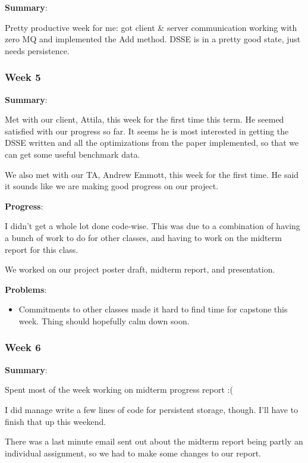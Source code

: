 \noindent \textbf{Summary}:

Pretty productive week for me: got client \& server communication working with zero MQ and implemented the Add method. DSSE is in a pretty good state, just needs persistence.

\subsubsection{Week 5}

\noindent \textbf{Summary}:

Met with our client, Attila, this week for the first time this term. He seemed satisfied with our progress so far. It seems he is most interested in getting the DSSE written and all the optimizations from the paper implemented, so that we can get some useful benchmark data. 

We also met with our TA, Andrew Emmott, this week for the first time.
He said it sounds like we are making good progress on our project.

\noindent \textbf{Progress}:

I didn't get a whole lot done code-wise. This was due to a combination of having a bunch of work to do for other classes, and having to work on the midterm report for this class.

We worked on our project poster draft, midterm report, and presentation.

\noindent \textbf{Problems}:

\begin{itemize}
\item Commitments to other classes made it hard to find time for capstone this week. Thing should hopefully calm down soon.
\end{itemize}


\subsubsection{Week 6}

\noindent \textbf{Summary}:

Spent most of the week working on midterm progress report :( 

I did manage write a few lines of code for persistent storage, though. I'll have to finish that up this weekend. 

 There was a last minute email sent out about the midterm report being partly an individual assignment, so we had to make some changes to our report.  



